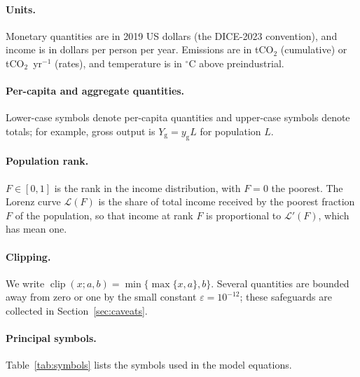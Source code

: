 \documentclass[11pt]{article}
\newcommand{\clip}{\operatorname{clip}}
\newcommand{\Lor}{\mathcal{L}}
\newcommand{\yg}{y_{\mathrm{g}}}
\begin{document}
\paragraph{Units.} Monetary quantities are in 2019 US dollars (the DICE-2023
convention), and income is in dollars per person per year. Emissions are in
tCO$_2$ (cumulative) or tCO$_2$~yr$^{-1}$ (rates), and temperature is in
$^\circ$C above preindustrial.

\paragraph{Per-capita and aggregate quantities.} Lower-case symbols denote
per-capita quantities and upper-case symbols denote totals; for example,
gross output is $Y_{\mathrm{g}} = \yg L$ for population $L$.

\paragraph{Population rank.} $F\in[0,1]$ is the rank in the income
distribution, with $F=0$ the poorest. The Lorenz curve $\Lor(F)$ is the share
of total income received by the poorest fraction $F$ of the population, so
that income at rank $F$ is proportional to $\Lor'(F)$, which has mean one.

\paragraph{Clipping.} We write $\clip(x; a, b) = \min\{\max\{x, a\}, b\}$.
Several quantities are bounded away from zero or one by the small constant
$\varepsilon = 10^{-12}$; these safeguards are collected in
Section~\ref{sec:caveats}.

\paragraph{Principal symbols.} Table~\ref{tab:symbols} lists the symbols used
in the model equations.
\end{document}
